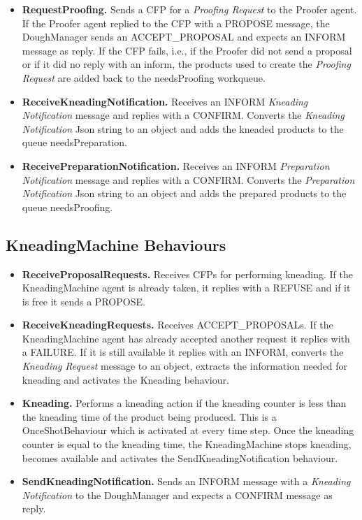 \documentclass[paper=a4, fontsize=11pt]{scrartcl}
\begin{document}
\begin{itemize}
		\item \textbf{RequestProofing.} Sends a CFP for a \textit{Proofing Request} to the Proofer agent. If the Proofer agent replied to the CFP with a PROPOSE message, the DoughManager 
		sends an ACCEPT\_PROPOSAL and expects an INFORM message as reply. If the CFP fails, i.e., if the Proofer did not send a proposal or if it did no reply with an inform, the products used to create the \textit{Proofing Request} are added back to the needsProofing workqueue.
		
		\item \textbf{ReceiveKneadingNotification.} Receives an INFORM \textit{Kneading Notification} message and replies with a CONFIRM. Converts the \textit{Kneading Notification} Json string to an object and adds the kneaded products to the queue needsPreparation. 
		
		\item \textbf{ReceivePreparationNotification.} Receives an INFORM \textit{Preparation Notification} message and replies with a CONFIRM. Converts the \textit{Preparation Notification} Json string to an object and adds the prepared products to the queue needsProofing.
			
	\end{itemize}
	
	\subsection*{KneadingMachine Behaviours}
	
	\begin{itemize}
		\item \textbf{ReceiveProposalRequests.} Receives CFPs for performing kneading. If the KneadingMachine agent is already taken, it replies with a REFUSE and if it is free it sends a PROPOSE.
		
		\item \textbf{ReceiveKneadingRequests.} Receives ACCEPT\_PROPOSALs.  If the KneadingMachine agent has already accepted another request it replies with a FAILURE. If it is still available it replies with an INFORM, converts the \textit{Kneading Request} message to an object, extracts the information needed for kneading and activates the Kneading behaviour. 
		
		\item \textbf{Kneading.} Performs a kneading action if the kneading counter is less than the kneading time of the product being produced. This is a OnceShotBehaviour which is activated at every time step. Once the kneading counter is equal to the kneading time, the KneadingMachine stops kneading, becomes available and activates the SendKneadingNotification behaviour.  
		
		\item \textbf{SendKneadingNotification.} Sends an INFORM message with a \textit{Kneading Notification} to the DoughManager and expects a CONFIRM message as reply. 
	\end{itemize}
	
\end{document}

